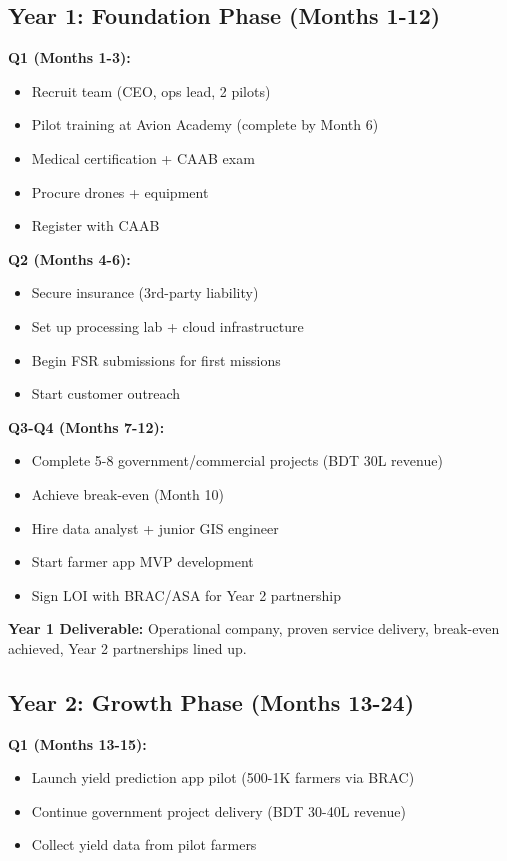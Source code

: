 \subsection{Year 1: Foundation Phase (Months 1-12)}

\textbf{Q1 (Months 1-3):}
\begin{itemize}
    \item Recruit team (CEO, ops lead, 2 pilots)
    \item Pilot training at Avion Academy (complete by Month 6)
    \item Medical certification + CAAB exam
    \item Procure drones + equipment
    \item Register with CAAB
\end{itemize}

\textbf{Q2 (Months 4-6):}
\begin{itemize}
    \item Secure insurance (3rd-party liability)
    \item Set up processing lab + cloud infrastructure
    \item Begin FSR submissions for first missions
    \item Start customer outreach
\end{itemize}

\textbf{Q3-Q4 (Months 7-12):}
\begin{itemize}
    \item Complete 5-8 government/commercial projects (BDT 30L revenue)
    \item Achieve break-even (Month 10)
    \item Hire data analyst + junior GIS engineer
    \item Start farmer app MVP development
    \item Sign LOI with BRAC/ASA for Year 2 partnership
\end{itemize}

\textbf{Year 1 Deliverable:} Operational company, proven service delivery, break-even achieved, Year 2 partnerships lined up.

\subsection{Year 2: Growth Phase (Months 13-24)}

\textbf{Q1 (Months 13-15):}
\begin{itemize}
    \item Launch yield prediction app pilot (500-1K farmers via BRAC)
    \item Continue government project delivery (BDT 30-40L revenue)
    \item Collect yield data from pilot farmers
\end{itemize}

